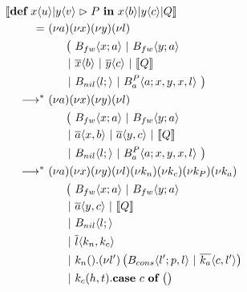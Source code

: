 \begin{align*}
  &\encMJtoAP{\jdef{\jrct{\jrcv{x}{u} \jpat \jrcv{y}{v}}{P}}{\jsnd{x}{b} \jpar \jsnd{y}{c} \jpar Q}}
  \\ &\hspace{0.5cm}
  \begin{aligned}[t]
    =\ &
    \anew{a}{\anew{x}{\anew{y}{\anew{l}{ \\
      &\hspace{0.5cm}
      \begin{aligned}[t]
        \big(\ &\ains{B_{fw}}{x}{a}
        \apar   \ains{B_{fw}}{y}{a} \\
        \apar  &\asnd{x}{b} \apar \asnd{y}{c} \apar \encMJtoAP{Q} \\
        \apar  &\ains{B_{nil}}{l}{}
        \apar   \ains{B_a^P}{a}{x, y, x, l}
        \ \big)
      \end{aligned}
    }}}}
    \\
    \apireduction{}^*\ & %
    \anew{a}{\anew{x}{\anew{y}{\anew{l}{ \\
      &\hspace{0.5cm}
      \begin{aligned}[t]
        \big(\ &\ains{B_{fw}}{x}{a}
        \apar   \ains{B_{fw}}{y}{a} \\
        \apar  &\asnd{a}{x,b} \apar \asnd{a}{y,c} \apar \encMJtoAP{Q} \\
        \apar  &\ains{B_{nil}}{l}{}
        \apar   \ains{B_a^P}{a}{x, y, x, l}
        \ \big)
      \end{aligned}
    }}}}
    \\
    \apireduction{}^*\ & %
    \anew{a}{\anew{x}{\anew{y}{\anew{l}{\anew{k_n}{\anew{k_c}{\anew{k_P}{\anew{k_a}{ \\
      &\hspace{0.5cm}
      \begin{aligned}[t]
        \big(\ &\ains{B_{fw}}{x}{a}
        \apar   \ains{B_{fw}}{y}{a} \\
        \apar  &\asnd{a}{y,c} \apar \encMJtoAP{Q} \\
        \apar  &\ains{B_{nil}}{l}{} \\
        \apar  &\asnd{l}{k_n,k_c} \\
        \apar  &\arcv{k_n}{} . \anew{l'}{\parens{\ains{B_{cons}}{l'}{p, l} \apar \asnd{k_a}{c, l'}}} \\
        \apar  &\arcv{k_c}{h,t} .
          \begin{aligned}[t]
            \acse*{c}{
}
\end{aligned}
\end{aligned}}}}}}}}}
\end{aligned}
\end{align*}
